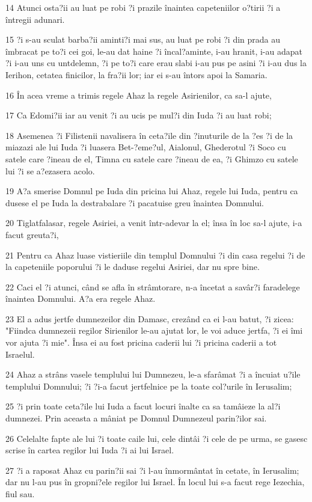 \par 14 Atunci osta?ii au luat pe robi ?i prazile înaintea capeteniilor o?tirii ?i a întregii adunari.
\par 15 ?i s-au sculat barba?ii aminti?i mai sus, au luat pe robi ?i din prada au îmbracat pe to?i cei goi, le-au dat haine ?i încal?aminte, i-au hranit, i-au adapat ?i i-au uns cu untdelemn, ?i pe to?i care erau slabi i-au pus pe asini ?i i-au dus la Ierihon, cetatea finicilor, la fra?ii lor; iar ei s-au întors apoi la Samaria.
\par 16 În acea vreme a trimis regele Ahaz la regele Asirienilor, ca sa-l ajute,
\par 17 Ca Edomi?ii iar au venit ?i au ucis pe mul?i din Iuda ?i au luat robi;
\par 18 Asemenea ?i Filistenii navalisera în ceta?ile din ?inuturile de la ?es ?i de la miazazi ale lui Iuda ?i luasera Bet-?eme?ul, Aialonul, Ghederotul ?i Soco cu satele care ?ineau de el, Timna cu satele care ?ineau de ea, ?i Ghimzo cu satele lui ?i se a?ezasera acolo.
\par 19 A?a smerise Domnul pe Iuda din pricina lui Ahaz, regele lui Iuda, pentru ca dusese el pe Iuda la destrabalare ?i pacatuise greu înaintea Domnului.
\par 20 Tiglatfalasar, regele Asiriei, a venit într-adevar la el; însa în loc sa-l ajute, i-a facut greuta?i,
\par 21 Pentru ca Ahaz luase vistieriile din templul Domnului ?i din casa regelui ?i de la capeteniile poporului ?i le daduse regelui Asiriei, dar nu spre bine.
\par 22 Caci el ?i atunci, când se afla în strâmtorare, n-a încetat a savâr?i faradelege înaintea Domnului. A?a era regele Ahaz.
\par 23 El a adus jertfe dumnezeilor din Damasc, crezând ca ei l-au batut, ?i zicea: "Fiindca dumnezeii regilor Sirienilor le-au ajutat lor, le voi aduce jertfa, ?i ei îmi vor ajuta ?i mie". Însa ei au fost pricina caderii lui ?i pricina caderii a tot Israelul.
\par 24 Ahaz a strâns vasele templului lui Dumnezeu, le-a sfarâmat ?i a încuiat u?ile templului Domnului; ?i ?i-a facut jertfelnice pe la toate col?urile în Ierusalim;
\par 25 ?i prin toate ceta?ile lui Iuda a facut locuri înalte ca sa tamâieze la al?i dumnezei. Prin aceasta a mâniat pe Domnul Dumnezeul parin?ilor sai.
\par 26 Celelalte fapte ale lui ?i toate caile lui, cele dintâi ?i cele de pe urma, se gasesc scrise în cartea regilor lui Iuda ?i ai lui Israel.
\par 27 ?i a raposat Ahaz cu parin?ii sai ?i l-au înmormântat în cetate, în Ierusalim; dar nu l-au pus în gropni?ele regilor lui Israel. În locul lui s-a facut rege Iezechia, fiul sau.

